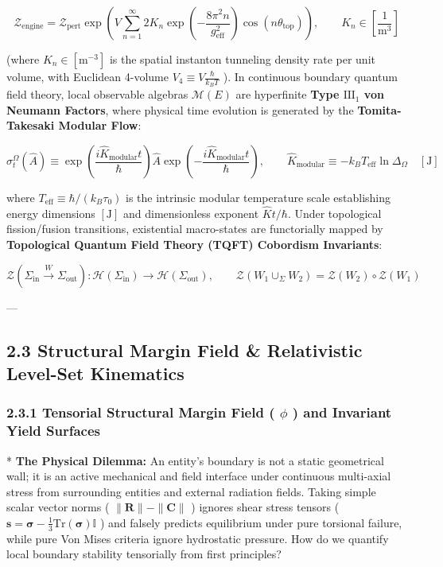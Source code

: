 \documentclass[11pt,a4paper]{article}
\theoremstyle{definition}
\theoremstyle{remark}
\begin{document}
\begin{equation}
\boxed{\mathcal{Z}_{\text{engine}} = \mathcal{Z}_{\text{pert}} \exp\left( V \sum_{n=1}^\infty 2 K_n \exp\left( -\frac{8\pi^2 n}{g_{\text{eff}}^2} \right) \cos\left( n \theta_{\text{top}} \right) \right), \qquad K_n \in [\frac{1}{\mathrm{m^3}}]}
\end{equation}


(where $K_n \in [\mathrm{m^{-3}}]$ is the spatial instanton tunneling density rate per unit volume, with Euclidean 4-volume $V_4 \equiv V \frac{\hbar}{k_B T}$ ).
In continuous boundary quantum field theory, local observable algebras $\mathcal{M}(E)$ are hyperfinite \textbf{Type $\mathrm{III}_1$ von Neumann Factors}, where physical time evolution is generated by the \textbf{Tomita-Takesaki Modular Flow}:


\begin{equation}
\boxed{\sigma_t^{\Omega}(\hat{A}) \equiv \exp\left( \frac{i \hat{K}_{\text{modular}} t}{\hbar} \right) \hat{A} \exp\left( -\frac{i \hat{K}_{\text{modular}} t}{\hbar} \right), \qquad \hat{K}_{\text{modular}} \equiv -k_B T_{\text{eff}} \ln \Delta_{\Omega} \quad [\mathrm{J}]}
\end{equation}


where $T_{\text{eff}} \equiv \hbar / (k_B \tau_0)$ is the intrinsic modular temperature scale establishing energy dimensions $[\mathrm{J}]$ and dimensionless exponent $\hat{K}t/\hbar$. Under topological fission/fusion transitions, existential macro-states are functorially mapped by \textbf{Topological Quantum Field Theory (TQFT) Cobordism Invariants}:


\begin{equation}
\boxed{\mathcal{Z}\left( \Sigma_{\text{in}} \xrightarrow{W} \Sigma_{\text{out}} \right): \mathcal{H}\left(\Sigma_{\text{in}}\right) \longrightarrow \mathcal{H}\left(\Sigma_{\text{out}}\right), \qquad \mathcal{Z}\left(W_1 \cup_\Sigma W_2\right) = \mathcal{Z}(W_2) \circ \mathcal{Z}(W_1)}
\end{equation}


---

\subsection{2.3 Structural Margin Field \& Relativistic Level-Set Kinematics}

\subsubsection{2.3.1 Tensorial Structural Margin Field ( $\phi$ ) and Invariant Yield Surfaces}
* \textbf{The Physical Dilemma:} An entity's boundary is not a static geometrical wall; it is an active mechanical and field interface under continuous multi-axial stress from surrounding entities and external radiation fields. Taking simple scalar vector norms ( $\|\mathbf{R}\| - \|\mathbf{C}\|$ ) ignores shear stress tensors ( $\mathbf{s} = \boldsymbol{\sigma} - \frac{1}{3}\mathrm{Tr}(\boldsymbol{\sigma})\mathbb{I}$ ) and falsely predicts equilibrium under pure torsional failure, while pure Von Mises criteria ignore hydrostatic pressure. How do we quantify local boundary stability tensorially from first principles?
\end{document}
